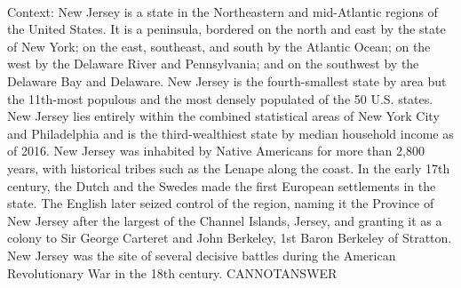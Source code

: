 \documentclass[11pt,a4paper, onecolumn]{article}
\begin{document}
\\ Context: New Jersey is a state in the Northeastern and mid-Atlantic regions of the United States. It is a peninsula, bordered on the north and east by the state of New York; on the east, southeast, and south by the Atlantic Ocean; on the west by the Delaware River and Pennsylvania; and on the southwest by the Delaware Bay and Delaware. New Jersey is the fourth-smallest state by area but the 11th-most populous and the most densely populated of the 50 U.S. states. New Jersey lies entirely within the combined statistical areas of New York City and Philadelphia and is the third-wealthiest state by median household income as of 2016. New Jersey was inhabited by Native Americans for more than 2,800 years, with historical tribes such as the Lenape along the coast. In the early 17th century, the Dutch and the Swedes made the first European settlements in the state. The English later seized control of the region, naming it the Province of New Jersey after the largest of the Channel Islands, Jersey, and granting it as a colony to Sir George Carteret and John Berkeley, 1st Baron Berkeley of Stratton. New Jersey was the site of several decisive battles during the American Revolutionary War in the 18th century. CANNOTANSWER
\end{document}
